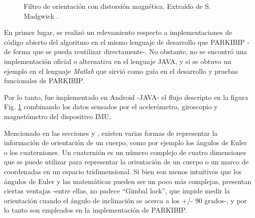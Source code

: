 \begin{figure}[H]
    \centering
    \caption{Filtro de orientación con distorsión magnética. Extraído de S. Madgwick \cite{Madgwick}.}
    \label{FIG:madgwick}
\end{figure}

En primer lugar, se realizó un relevamiento respecto a implementaciones de código abierto del algoritmo en el mismo lenguaje de desarrollo que PARKIBIP -de forma que se pueda reutilizar directamente-. No obstante, no se encontró una implementación oficial o alternativa en el lenguaje JAVA, y  si se obtuvo un ejemplo en el lenguaje \textit{Matlab} que sirvió como guía en el desarrollo y pruebas funcionales de PARKIBIP.

Por lo tanto, fue implementado en Android -JAVA- el flujo descripto en la figura Fig. \ref{FIG:madgwick} combinando los datos sensados por el acelerómetro, giroscopio y magnetómetro del dispositivo IMU.

Mencionado en las secciones  y , existen varias formas de representar la información de orientación de un cuerpo, como por ejemplo los ángulos de Euler o los cuaterniones. Un cuaternión es un número complejo de cuatro dimensiones que se puede utilizar para representar la orientación de un cuerpo o un marco de coordenadas en un espacio tridimensional. Si bien son menos intuitivos que los ángulos de Euler y las matemáticas pueden ser un poco más complejas, presentan ciertas ventajas -entre ellas, no padece ``Gimbal lock'', que impide medir la orientación cuando el ángulo de inclinación se acerca a los +/- 90 grados-, y por lo tanto son empleados en la implementación de PARKIBIP.

